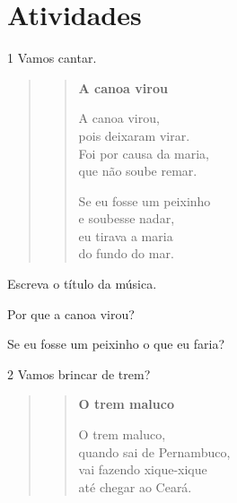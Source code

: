 \section*{Atividades}

\num{1} Vamos cantar.


\begin{quote}
\begin{verse}
\textbf{A canoa virou}

A canoa virou,\\
pois deixaram virar.\\
Foi por causa da maria,\\
que não soube remar.

Se eu fosse um peixinho\\
e soubesse nadar,\\
eu tirava a maria\\
do fundo do mar.
\end{verse}

\end{quote}

\begin{escolha}
\item Escreva o título da música.


\item Por que a canoa virou?


\item Se eu fosse um peixinho o que eu faria?

\end{escolha}

\num{2} Vamos brincar de trem?


\begin{quote}
\begin{verse}
\textbf{O trem maluco}

O trem maluco,\\
quando sai de Pernambuco,\\
vai fazendo xique-xique\\
até chegar ao Ceará.
\end{verse}
\end{quote}

